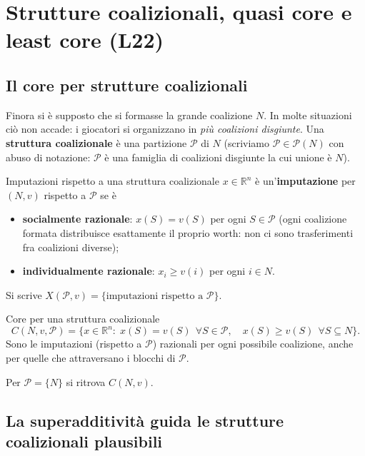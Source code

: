\documentclass[12pt,a4paper,twoside]{book}
\theoremstyle{plain}
\theoremstyle{definition}
\begin{document}
\chapter{Strutture coalizionali, quasi core e least core (L22)}
\label{ch:coal-struct}

\section{Il core per strutture coalizionali}

Finora si è supposto che si formasse la grande coalizione $N$. In molte
situazioni ciò non accade: i giocatori si organizzano in \emph{più coalizioni
disgiunte}. Una \textbf{struttura coalizionale} è una partizione
$\mathcal{P}$ di $N$ (scriviamo $\mathcal{P}\in\mathcal{P}(N)$ con abuso di
notazione: $\mathcal{P}$ è una famiglia di coalizioni disgiunte la cui unione
è $N$).

\begin{defbox}{Imputazioni rispetto a una struttura coalizionale}
$x\in\mathbb{R}^n$ è un'\textbf{imputazione} per $(N,v)$ rispetto a
$\mathcal{P}$ se è
\begin{itemize}
  \item \textbf{socialmente razionale}: $x(S)=v(S)$ per ogni $S\in\mathcal{P}$
        (ogni coalizione formata distribuisce esattamente il proprio worth: non
        ci sono trasferimenti fra coalizioni diverse);
  \item \textbf{individualmente razionale}: $x_i\ge v(i)$ per ogni $i\in N$.
\end{itemize}
Si scrive $X(\mathcal{P},v)=\{\text{imputazioni rispetto a }\mathcal{P}\}$.
\end{defbox}

\begin{defbox}{Core per una struttura coalizionale}
\[
  C(N,v,\mathcal{P})=\bigl\{x\in\mathbb{R}^n:\;x(S)=v(S)\ \ \forall S\in\mathcal{P},
  \quad x(S)\ge v(S)\ \ \forall S\subseteq N\bigr\}.
\]
Sono le imputazioni (rispetto a $\mathcal{P}$) razionali per ogni possibile
coalizione, anche per quelle che attraversano i blocchi di $\mathcal{P}$.
\end{defbox}

Per $\mathcal{P}=\{N\}$ si ritrova $C(N,v)$.

\section{La superadditività guida le strutture coalizionali plausibili}
\end{document}
